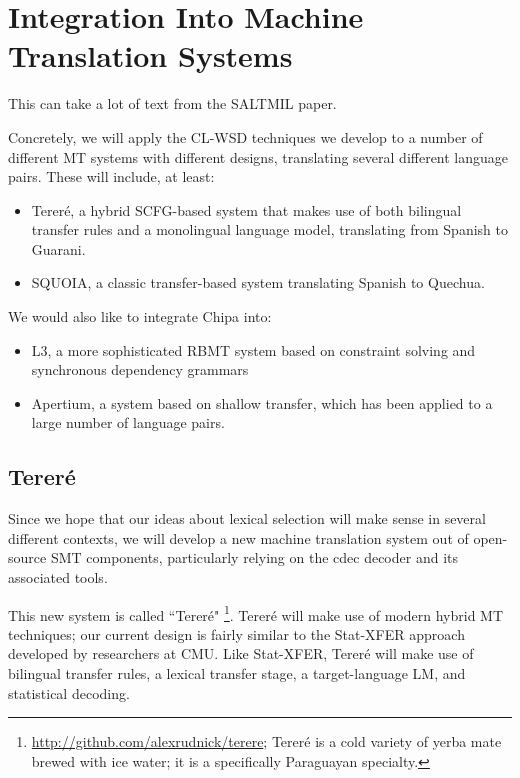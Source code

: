 \chapter{Integration Into Machine Translation Systems}
\label{chap:integration}

This can take a lot of text from the SALTMIL paper.


Concretely, we will apply the CL-WSD techniques we develop to a number of
different MT systems with different designs, translating several different
language pairs.  These will include, at least:
\begin{itemize}
\item Tereré, a hybrid SCFG-based system that makes use of both bilingual
transfer rules and a monolingual language model, translating from Spanish to
Guarani.
\item SQUOIA, a classic transfer-based system translating Spanish to Quechua.
\end{itemize}

We would also like to integrate Chipa into:

\begin{itemize}
\item L3, a more sophisticated RBMT system based on constraint solving and
synchronous dependency grammars 
\item Apertium, a system based on shallow transfer, which has been
applied to a large number of language pairs.
\end{itemize}


\section{Tereré}
\label{sec:terere}
Since we hope that our ideas about lexical selection will make sense in several
different contexts, we will develop a new machine translation system out of
open-source SMT components, particularly relying on the cdec decoder and its
associated tools.
\cite{dyer-EtAl:2010:Demos}


This new system is called ``Tereré"
\footnote{\url{http://github.com/alexrudnick/terere}; 
Tereré is a cold variety of yerba mate brewed with ice water; it is a
specifically Paraguayan specialty.}.
Tereré will make use of modern hybrid MT techniques; our current design is
fairly similar to the Stat-XFER approach \cite{DBLP:conf/cicling/Lavie08}
developed by researchers at CMU.
Like Stat-XFER, Tereré will make use of bilingual transfer rules, a lexical
transfer stage, a target-language LM, and statistical decoding.

